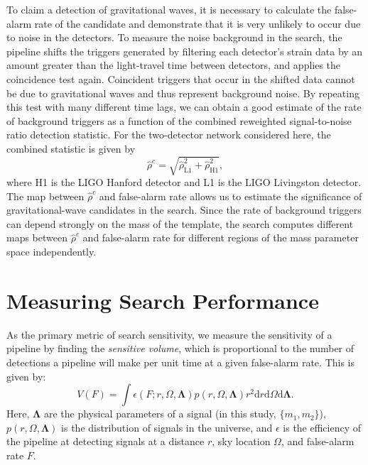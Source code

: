 To claim a detection of gravitational waves, it is necessary to calculate the
false-alarm rate of the candidate and demonstrate that it is very unlikely to
occur due to noise in the detectors. To measure the noise background in the
search, the pipeline shifts the triggers generated by filtering each
detector's strain data by an amount greater than the light-travel time between
detectors, and applies the coincidence test again.  Coincident triggers that
occur in the shifted data cannot be due to gravitational waves and thus represent
background noise. By repeating this test with many different time lags, we can
obtain a good estimate of the rate of background triggers as a function of the
combined reweighted signal-to-noise ratio detection statistic. For the 
two-detector network considered here, the combined statistic is given by
%
\begin{equation}
\hat{\rho}^c = \sqrt{\hat{\rho}_\mathrm{L1}^2 + \hat{\rho}_\mathrm{H1}^2},
\end{equation}
%
where H1 is the LIGO Hanford detector and L1 is the LIGO Livingston detector. 
The map between $\hat{\rho}^c$ and false-alarm rate allows us to estimate the
significance of gravitational-wave candidates in the search. Since the rate of
background triggers can depend strongly on the mass of the template,
the search computes different maps between $\hat{\rho}^c$ and
false-alarm rate for different regions of the mass parameter space
independently. 

\section{Measuring Search Performance}
\label{s:volume}

As the primary metric of search sensitivity, we measure the sensitivity of a 
pipeline by finding the \emph{sensitive
volume}, which is proportional to the number of detections a pipeline will
make per unit time at a given false-alarm rate. This is given by:
\begin{equation}
V(F) = \int \epsilon(F; r, \Omega, \mathbf{\Lambda}) p(r, \Omega, \mathbf{\Lambda}) r^2 \mathrm{d}r \mathrm{d}\Omega \mathrm{d}\mathbf{\Lambda}.
\end{equation}
Here, $\mathbf{\Lambda}$ are the physical parameters of a signal (in this
study, $\{m_1, m_2\}$), $p(r, \Omega, \mathbf{\Lambda})$ is the distribution of
signals in the universe, and $\epsilon$ is the efficiency of the pipeline at
detecting signals at a distance $r$, sky location $\Omega$, and false-alarm
rate $F$.

